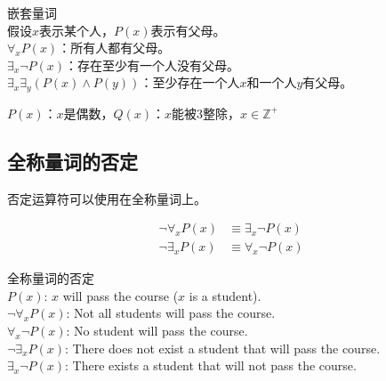 \documentclass[12pt, openany, oneside]{book}
\begin{document}
\begin{tcolorbox}
	嵌套量词\\
	假设$ x $表示某个人，$ P(x) $表示有父母。\\
	$ \forall_x P(x) $：所有人都有父母。\\
	$ \exists_x \neg P(x) $：存在至少有一个人没有父母。\\
	$ \exists_x \exists_y (P(x) \wedge P(y)) $：至少存在一个人$ x $和一个人$ y $有父母。
\end{tcolorbox}

\begin{tcolorbox}
	$ P(x) $：$ x $是偶数，$ Q(x) $：$ x $能被3整除，$ x \in \mathbb{Z}^+ $
	\begin{table}[H]
		\centering
	\end{table}
\end{tcolorbox}

\vspace{0.5cm}

\subsection{全称量词的否定}

否定运算符可以使用在全称量词上。

\vspace{-1cm}

\begin{align}
	\neg \forall_x P(x) & \equiv \exists_x \neg P(x) \\
	\neg \exists_x P(x) & \equiv \forall_x \neg P(x)
\end{align}

\begin{tcolorbox}
	全称量词的否定\\
	$ P(x) $: $ x $ will pass the course ($ x $ is a student).\\
	$ \neg \forall_x P(x) $: Not all students will pass the course.\\
	$ \forall_x \neg P(x) $: No student will pass the course.\\
	$ \neg \exists_x P(x) $: There does not exist a student that will pass the course.\\
	$ \exists_x \neg P(x) $: There exists a student that will not pass the course.
\end{tcolorbox}
\end{document}
